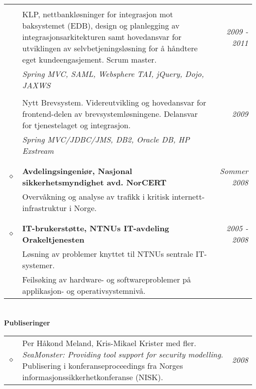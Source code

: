 \documentclass[overlapped,line,letterpaper]{res}
\begin{document}
\begin{resume}
\begin{tabularx}{\textwidth}{lXr}
      &&\\
      & KLP, nettbankløsninger for integrasjon mot baksystemet (EDB), design og planlegging
      av integrasjonsarkitekturen samt hovedansvar for
      utviklingen av selvbetjeningsløsning for å håndtere eget kundeengasjement. Scrum master. & \textit{2009 - 2011} \\
      & \small \textit{Spring MVC, SAML, Websphere TAI, jQuery, Dojo, JAXWS} & \\
      &&\\
      & Nytt Brevsystem. Videreutvikling og hovedansvar for frontend-delen
      av brevsystemløsningene. Delansvar for tjenestelaget og integrasjon. & \textit{2009} \\
      & \small \textit{Spring MVC/JDBC/JMS, DB2, Oracle DB, HP Exstream} & \\

&&\\
&&\\

   $\diamond$	& \textbf{Avdelingsingeniør, Nasjonal sikkerhetsmyndighet avd. NorCERT} 	& \textit{Sommer 2008}\\
			& Overvåkning og analyse av trafikk i kritisk
			internett-infrastruktur i Norge.										& \\

&&\\
&&\\
$\diamond$	& \textbf{IT-brukerstøtte, NTNUs IT-avdeling Orakeltjenesten} 	& \textit{2005 - 2008}\\
			& Løsning av problemer knyttet til NTNUs sentrale IT-systemer.			& \\
			& Feilsøking av hardware- og softwareproblemer på applikasjon- og 
			operativsystem\-nivå.													& \\

\end{tabularx}

\section{}
\textbf{Publiseringer}\\
\makebox[\textwidth]{\hrulefill}

\begin{tabularx}{\textwidth}{lXr}

$\diamond$	& Per Håkond Meland, Kris-Mikael Krister med fler.
\emph{SeaMonster: Providing tool support for security modelling}.
Publisering i konferanseproceedings fra Norges
informasjons\-sikkerhetkonferanse (NISK).  & \textit{2008}\\


\end{tabularx}
\end{resume}
\end{document}
